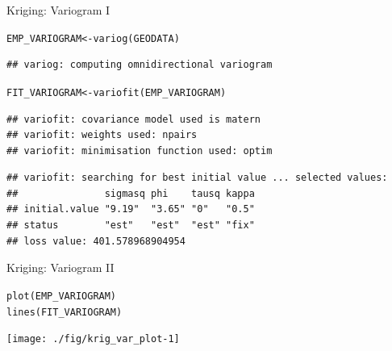 \documentclass[xcolor=table,           xcolor=dvipsnames]{beamer}\usepackage[]{graphicx}\usepackage[]{color}
\makeatletter
\newcommand{\hlstd}[1]{\textcolor[rgb]{0,0,0}{#1}}
\newcommand{\hlkwb}[1]{\textcolor[rgb]{0,0,0}{#1}}
\newcommand{\hlkwd}[1]{\textcolor[rgb]{0,0,1}{#1}}
\newenvironment{kframe}{%
 \def\at@end@of@kframe{}%
 \ifinner\ifhmode%
  \def\at@end@of@kframe{\end{minipage}}%
  \begin{minipage}{\columnwidth}%
 \fi\fi%
 \def\FrameCommand##1{\hskip\@totalleftmargin \hskip-\fboxsep
 \colorbox{shadecolor}{##1}\hskip-\fboxsep
     \hskip-\linewidth \hskip-\@totalleftmargin \hskip\columnwidth}%
 \MakeFramed {\advance\hsize-\width
   \@totalleftmargin\z@ \linewidth\hsize
   \@setminipage}}%
 {\par\unskip\endMakeFramed%
 \at@end@of@kframe}
\newenvironment{knitrout}{}{} %
\makeatother
\begin{document}

\begin{frame}[fragile]{Kriging: Variogram I}
\begin{knitrout}\scriptsize
{}\color{fgcolor}\begin{kframe}
\begin{alltt}
\hlstd{EMP_VARIOGRAM} \hlkwb{<-} \hlkwd{variog}\hlstd{(GEODATA)}
\end{alltt}
\begin{verbatim}
## variog: computing omnidirectional variogram
\end{verbatim}
\begin{alltt}
\hlstd{FIT_VARIOGRAM} \hlkwb{<-} \hlkwd{variofit}\hlstd{(EMP_VARIOGRAM)}
\end{alltt}
\begin{verbatim}
## variofit: covariance model used is matern 
## variofit: weights used: npairs 
## variofit: minimisation function used: optim
\end{verbatim}


{\ttfamily\noindent\color{warningcolor}{\#\# Warning in variofit(EMP\_VARIOGRAM): initial values not provided - running the default search}}\begin{verbatim}
## variofit: searching for best initial value ... selected values:
##               sigmasq phi    tausq kappa
## initial.value "9.19"  "3.65" "0"   "0.5"
## status        "est"   "est"  "est" "fix"
## loss value: 401.578968904954
\end{verbatim}
\end{kframe}
\end{knitrout}
\end{frame}


\begin{frame}[fragile]{Kriging: Variogram II}
\begin{knitrout}
\color{fgcolor}\begin{kframe}
\begin{alltt}
\hlkwd{plot}\hlstd{(EMP_VARIOGRAM)}
\hlkwd{lines}\hlstd{(FIT_VARIOGRAM)}
\end{alltt}
\end{kframe}

{\centering \texttt{[image: ./fig/krig\_var\_plot-1]} 

}



\end{knitrout}
\end{frame}
\end{document}
